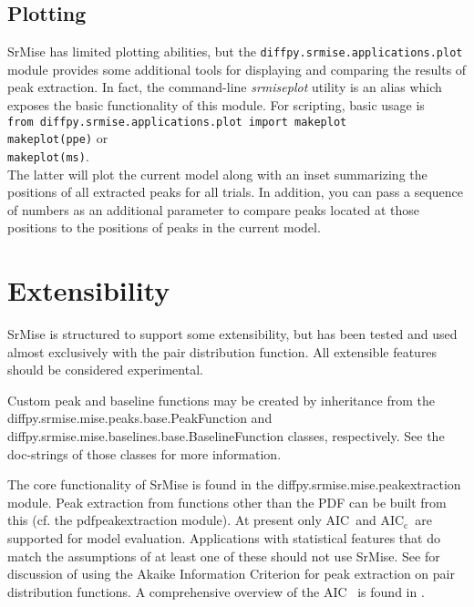 \documentclass[12pt]{article}
\newcommand{\rmsub}[2]{\ensuremath{\mathrm{#1}_{\mathrm{#2}}}}
\newcommand{\aic}{\ensuremath{\mathrm{AIC}}}
\newcommand{\aicc}{\rmsub{AIC}{c}}
\begin{document}
\subsection{Plotting}
{\sc SrMise} has limited plotting abilities, but the \texttt{diffpy.srmise.applications.plot} module provides some additional tools for displaying and comparing the results of peak extraction.  In fact, the command-line \emph{srmiseplot} utility is an alias which exposes the basic functionality of this module.  For scripting, basic usage is\\
\texttt{from diffpy.srmise.applications.plot import makeplot}\\
\texttt{makeplot(ppe)} or\\
\texttt{makeplot(ms)}.\\
The latter will plot the current model along with an inset summarizing the positions of all extracted peaks for all trials.  In addition, you can pass a sequence of numbers as an additional parameter to compare peaks located at those positions to the positions of peaks in the current model.


\section{Extensibility}

{\sc SrMise} is structured to support some extensibility, but has been tested and used almost exclusively with the pair distribution function.  All extensible features should be considered experimental.

Custom peak and baseline functions may be created by inheritance from the diffpy.srmise.mise.peaks.base.PeakFunction and diffpy.srmise.mise.baselines.base.BaselineFunction classes, respectively.  See the doc-strings of those classes for more information.

The core functionality of {\sc SrMise} is found in the diffpy.srmise.mise.peakextraction module.  Peak extraction from functions other than the PDF can be built from this (cf. the pdfpeakextraction module).  At present only \aic~and \aicc~are supported for model evaluation.  Applications with statistical features that do match the assumptions of at least one of these should not use {\sc SrMise}.  See  for discussion of using the Akaike Information Criterion for peak extraction on pair distribution functions.  A comprehensive overview of the \aic~ is found in .
\end{document}
